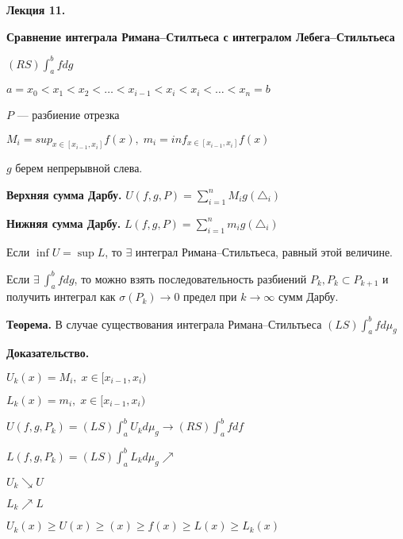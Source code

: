 

\begin{center} \textbf{Лекция 11.} \end{center}

\begin{center} \textbf{Сравнение интеграла Римана--Стилтьеса
с интегралом Лебега--Стильтьеса} \end{center}

$(RS) \int_a^b f d g$

$a = x_0 < x_1 < x_2 < \ldots < x_{i-1} < x_i < x_i < \ldots < x_n
= b$

$P$ --- разбиение отрезка

$M_i = sup_{x \in [x_{i-1}, x_i]} f(x), \; m_i = inf_{x \in
[x_{i-1}, x_i]} f(x)$

$g$ берем непрерывной слева.

\textbf{Верхняя сумма Дарбу.} \quad $U(f, g, P) = \sum_{i=1}^n M_i
g(\triangle_i)$

\textbf{Нижняя сумма Дарбу.} \quad $L(f, g, P) = \sum_{i=1}^n m_i
g(\triangle_i)$

Если $\inf U = \sup L$, то $\exists$ интеграл Римана--Стильтьеса,
равный этой величине.

Если $\exists \: \int_a^b f d g$, то можно взять
последовательность разбиений $P_k, P_k \subset P_{k+1}$
 и получить интеграл как $\sigma(P_k) \rightarrow 0 $ предел при $k
\rightarrow \infty$ сумм Дарбу.

\textbf{Теорема.} \quad В случае существования интеграла
Римана--Стильтьеса $(LS) \int_a^b f d \mu_g$

%
%
%
%
%
%
%
%
%
%
%
\textbf{Доказательство.} \quad

$U_k(x) = M_i, \; x \in [x_{i-1}, x_i)$

$L_k(x) = m_i, \; x \in [x_{i-1}, x_i)$

$U(f, g, P_k) = (LS) \int_a^b U_k d \mu_g \rightarrow (RS)
\int_a^b f d f$

$L(f, g, P_k) = (LS) \int_a^b L_k d \mu_g\nearrow$

$U_k \searrow U$

$L_k \nearrow L$

$U_k (x) \geqslant U(x) \geqslant (x) \geqslant f(x) \geqslant
L(x) \geqslant L_k(x)$

